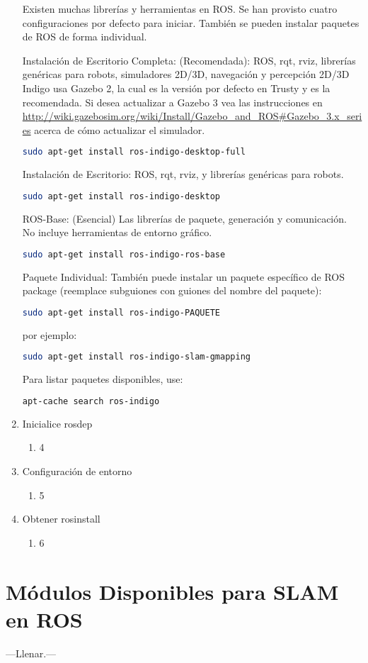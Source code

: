 \begin{enumerate}
	Existen muchas librerías y herramientas en ROS. Se han provisto cuatro configuraciones por defecto para iniciar. También se pueden instalar paquetes de ROS de forma individual.

	Instalación de Escritorio Completa: (Recomendada): ROS, rqt, rviz, librerías genéricas para robots, simuladores 2D/3D, navegación y percepción 2D/3D
	Indigo usa Gazebo 2, la cual es la versión por defecto en Trusty y es la recomendada. Si desea actualizar a Gazebo 3 vea las instrucciones en \url{http://wiki.gazebosim.org/wiki/Install/Gazebo_and_ROS#Gazebo_3.x_series} acerca de cómo actualizar el simulador.

	\begin{lstlisting}[language=bash]
sudo apt-get install ros-indigo-desktop-full
	\end{lstlisting}

	Instalación de Escritorio: ROS, rqt, rviz, y librerías genéricas para robots.

	\begin{lstlisting}[language=bash]
sudo apt-get install ros-indigo-desktop
	\end{lstlisting}

	ROS-Base: (Esencial) Las librerías de paquete, generación y comunicación. No incluye herramientas de entorno gráfico.

	\begin{lstlisting}[language=bash]
sudo apt-get install ros-indigo-ros-base
	\end{lstlisting}

	Paquete Individual: También puede instalar un paquete específico de ROS package (reemplace subguiones con guiones del nombre del paquete):

	\begin{lstlisting}[language=bash]
sudo apt-get install ros-indigo-PAQUETE
	\end{lstlisting}
	por ejemplo:
	\begin{lstlisting}[language=bash]
sudo apt-get install ros-indigo-slam-gmapping
	\end{lstlisting}

Para listar paquetes disponibles, use:
	\begin{lstlisting}[language=bash]
apt-cache search ros-indigo
	\end{lstlisting}

	\item Inicialice rosdep
	\begin{enumerate}
		\item 4
	\end{enumerate}

	\item Configuración de entorno
	\begin{enumerate}
		\item 5
	\end{enumerate}

	\item Obtener rosinstall
	\begin{enumerate}
		\item 6
	\end{enumerate}
\end{enumerate}

\section{Módulos Disponibles para SLAM en ROS}

---Llenar.---